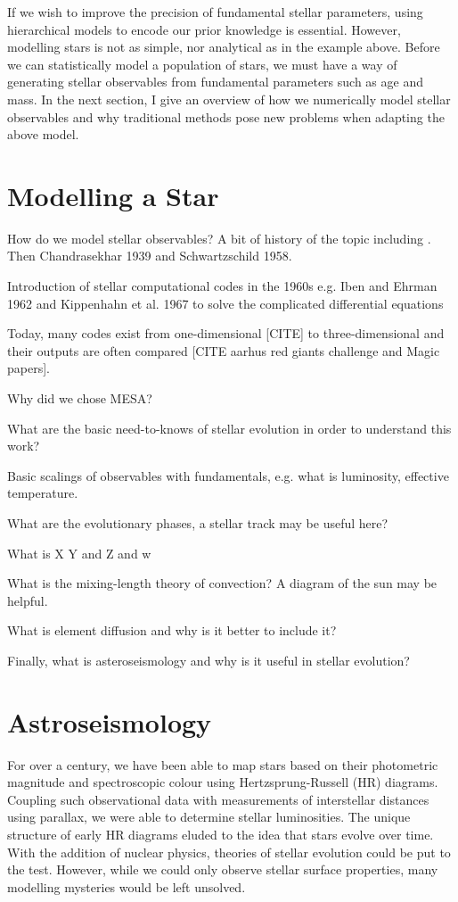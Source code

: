 If we wish to improve the precision of fundamental stellar parameters, using hierarchical models to encode our prior knowledge is essential. However, modelling stars is not as simple, nor analytical as in the example above. Before we can statistically model a population of stars, we must have a way of generating stellar observables from fundamental parameters such as age and mass. In the next section, I give an overview of how we numerically model stellar observables and why traditional methods pose new problems when adapting the above model.

\section{Modelling a Star}

How do we model stellar observables? A bit of history of the topic including \citet{Eddington1926}. Then Chandrasekhar 1939 and Schwartzschild 1958.

Introduction of stellar computational codes in the 1960s e.g. Iben and Ehrman 1962 and Kippenhahn et al. 1967 to solve the complicated differential equations

Today, many codes exist from one-dimensional [CITE] to three-dimensional and their outputs are often compared [CITE aarhus red giants challenge and Magic papers].

Why did we chose MESA? 

What are the basic need-to-knows of stellar evolution in order to understand this work?

Basic scalings of observables with fundamentals, e.g. what is luminosity, effective temperature. 

What are the evolutionary phases, a stellar track may be useful here?

What is X Y and Z and w

What is the mixing-length theory of convection? A diagram of the sun may be helpful.

What is element diffusion and why is it better to include it?

Finally, what is asteroseismology and why is it useful in stellar evolution?

\section{Astroseismology}

For over a century, we have been able to map stars based on their photometric magnitude and spectroscopic colour using Hertzsprung-Russell (HR) diagrams. Coupling such observational data with measurements of interstellar distances using parallax, we were able to determine stellar luminosities. The unique structure of early HR diagrams eluded to the idea that stars evolve over time. With the addition of nuclear physics, theories of stellar evolution could be put to the test. However, while we could only observe stellar surface properties, many modelling mysteries would be left unsolved.


